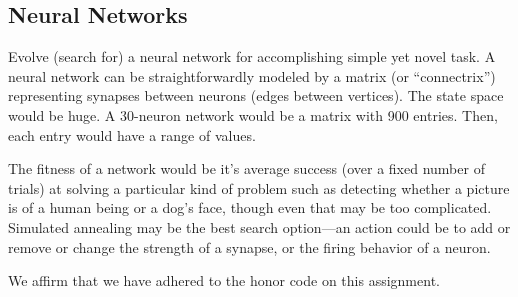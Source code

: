 \documentclass[11pt]{amsart}
\newcommand{\honor}{We affirm that we have adhered to the honor code on this assignment.}
\begin{document}
\subsection*{Neural Networks}
Evolve (search for) a neural network for accomplishing simple yet novel task. A
neural network can be straightforwardly modeled by a matrix (or “connectrix”)
representing synapses between neurons (edges between vertices). The state space
would be huge. A 30-neuron network would be a matrix with 900 entries. Then,
each entry would have a range of values.

The fitness of a network would be it's average success (over a fixed number of
trials) at solving a particular kind of problem such as detecting whether a
picture is of a human being or a dog's face, though even that may be too
complicated. Simulated annealing may be the best search option\----an action could
be to add or remove or change the strength of a synapse, or the firing behavior
of a neuron.

\honor
\end{document}

